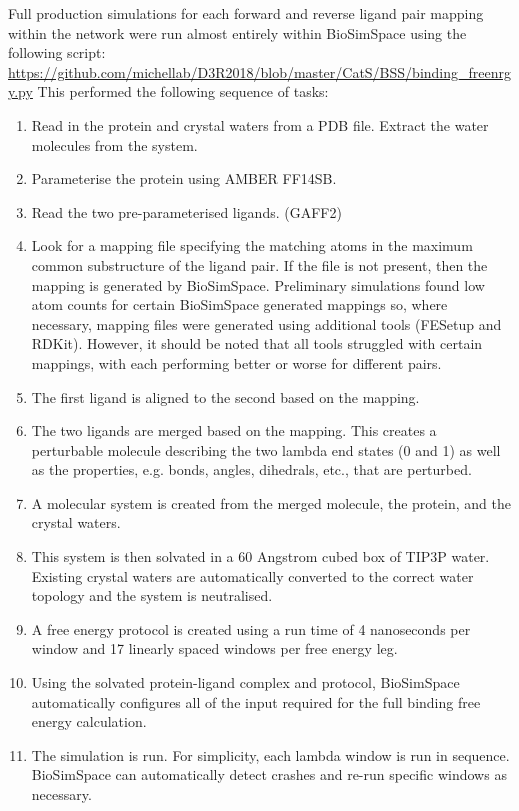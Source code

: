\documentclass[9pt,comparison]{livecoms}
\begin{document}
Full production simulations for each forward and reverse ligand pair mapping
within the network were run almost entirely within BioSimSpace using the
following script:
\url{https://github.com/michellab/D3R2018/blob/master/CatS/BSS/binding_freenrgy.py}
This performed the following sequence of tasks:
\begin{enumerate}
\item Read in the protein and crystal waters from a PDB file. Extract the
   water molecules from the system.
\item Parameterise the protein using AMBER FF14SB.
\item Read the two pre-parameterised ligands. (GAFF2)
\item Look for a mapping file specifying the matching atoms in the maximum
   common substructure of the ligand pair. If the file is not present,
   then the mapping is generated by BioSimSpace. Preliminary simulations
   found low atom counts for certain BioSimSpace generated mappings so,
   where necessary, mapping files were generated using additional tools
   (FESetup and RDKit). However, it should be noted that all tools struggled
   with certain mappings, with each performing better or worse for
   different pairs.
\item The first ligand is aligned to the second based on the mapping.
\item The two ligands are merged based on the mapping. This creates a
   perturbable molecule describing the two lambda end states (0 and 1)
   as well as the properties, e.g. bonds, angles, dihedrals, etc., that
   are perturbed.
\item A molecular system is created from the merged molecule, the protein,
   and the crystal waters.
\item This system is then solvated in a 60 Angstrom cubed box of TIP3P
   water. Existing crystal waters are automatically converted to the
   correct water topology and the system is neutralised.
\item A free energy protocol is created using a run time of 4 nanoseconds
   per window and 17 linearly spaced windows per free energy leg.
\item Using the solvated protein-ligand complex and protocol, BioSimSpace
    automatically configures all of the input required for the full
    binding free energy calculation.
\item The simulation is run. For simplicity, each lambda window is run in
    sequence. BioSimSpace can automatically detect crashes and re-run
    specific windows as necessary.
   \end{enumerate}
\end{document}
